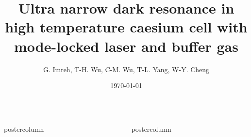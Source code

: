 \documentclass[final,hyperref={pdfpagelabels=false,unicode}]{beamer}
\title{\huge Ultra narrow dark resonance in high temperature caesium cell with mode-locked laser and buffer gas}
\author{G. Imreh, T-H. Wu, C-M. Wu, T-L. Yang, W-Y. Cheng}
\institute[IAMS, Academia Sinica]{Institute of Atomic and Molecular Sciences, Academia Sinica, Taiwan}
\date{\today}
\newlength{\columnheight}
\begin{document}
\begin{frame}

  \begin{columns}
    \begin{column}{.49\textwidth}
      \begin{beamercolorbox}[center,wd=\textwidth]{postercolumn}
        \begin{minipage}[T]{.95\textwidth}
          \parbox[t][\columnheight]{\textwidth}{

            

            \vfill

            

            \vfill

            

          }
        \end{minipage}
      \end{beamercolorbox}
    \end{column}
    \begin{column}{.49\textwidth}
      \begin{beamercolorbox}[center,wd=\textwidth]{postercolumn}
        \begin{minipage}[T]{.95\textwidth}
          \parbox[t][\columnheight]{\textwidth}{

            
            \vfill

            
            \vfill

            
          }
        \end{minipage}
      \end{beamercolorbox}
    \end{column}
  \end{columns}
\end{frame}
\end{document}
